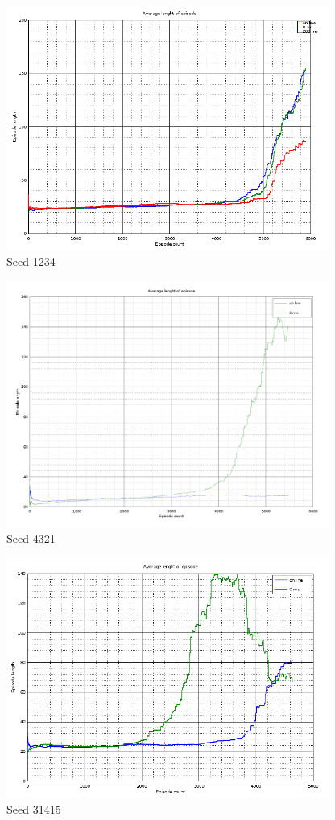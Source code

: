 \documentclass[a4paper,11pt]{article}
\begin{document}
\begin{figure}
\label{fig:seed1234}
\includegraphics[width=300pt]{episodes-123}
\caption{Seed 1234}
\end{figure}

\begin{figure}
\label{fig:seed4321}
\includegraphics[width=300pt]{episodes-321}
\caption{Seed 4321}
\end{figure}

\begin{figure}
\label{fig:seed31415}
\includegraphics[width=300pt]{episodes-314}
\caption{Seed 31415}
\end{figure}
\end{document}
